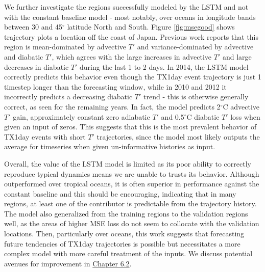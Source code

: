 \documentclass[11pt,a4paper,twoside,openright]{report}
\theoremstyle{definition}
\begin{document}
We further investigate the regions successfully modeled by the LSTM and not with the constant baseline model - most notably, over oceans in longitude bands between 30 and 45\(^\circ\) latitude North and South. Figure \ref{fig:msegood} shows trajectory plots a location off the coast of Japan. Previous work reports that this region is mean-dominated by advective \(T'\) and variance-dominated by advective and diabatic \(T'\), which agrees with the large increases in advective \(T'\) and large decreases in diabatic \(T'\) during the last 1 to 2 days. In 2014, the LSTM model correctly predicts this behavior even though the TX1day event trajectory is just 1 timestep longer than the forecasting window, while in 2010 and 2012 it incorrectly predicts a decreasing diabatic \(T'\) trend - this is otherwise generally correct, as seen for the remaining years. In fact, the model predicts 2\(^\circ\)C advective \(T'\) gain, approximately constant zero adiabatic \(T'\) and 0.5\(^\circ\)C diabatic \(T'\) loss when given an input of zeros. This suggests that this is the most prevalent behavior of TX1day events with short \(T'\) trajectories, since the model most likely outputs the average for timeseries when given un-informative histories as input.

Overall, the value of the LSTM model is limited as its poor ability to correctly reproduce typical dynamics means we are unable to trusts its behavior. Although outperformed over tropical oceans, it is often superior in performance against the constant baseline and this should be encouraging, indicating that in many regions, at least one of the contributor is predictable from the trajectory history. The model also generalized from the training regions to the validation regions well, as the areas of higher MSE loss do not seem to collocate with the validation locations. Then, particularly over oceans, this work suggests that forecasting future tendencies of TX1day trajectories is possible but necessitates a more complex model with more careful treatment of the inputs. We discuss potential avenues for improvement in \hyperref[limitations-and-future-work]{Chapter 6.2}.
\end{document}
